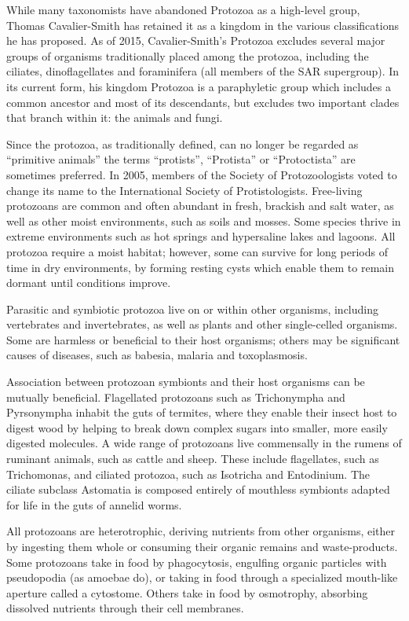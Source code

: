 While many taxonomists have abandoned Protozoa as a high-level group, Thomas Cavalier-Smith has retained it as a kingdom in the various classifications he has proposed. As of 2015, Cavalier-Smith's Protozoa excludes several major groups of organisms traditionally placed among the protozoa, including the ciliates, dinoflagellates and foraminifera (all members of the SAR supergroup). In its current form, his kingdom Protozoa is a paraphyletic group which includes a common ancestor and most of its descendants, but excludes two important clades that branch within it: the animals and fungi.

Since the protozoa, as traditionally defined, can no longer be regarded as ``primitive animals'' the terms ``protists'', ``Protista'' or ``Protoctista'' are sometimes preferred. In 2005, members of the Society of Protozoologists voted to change its name to the International Society of Protistologists.
Free-living protozoans are common and often abundant in fresh, brackish and salt water, as well as other moist environments, such as soils and mosses. Some species thrive in extreme environments such as hot springs and hypersaline lakes and lagoons. All protozoa require a moist habitat; however, some can survive for long periods of time in dry environments, by forming resting cysts which enable them to remain dormant until conditions improve.

Parasitic and symbiotic protozoa live on or within other organisms, including vertebrates and invertebrates, as well as plants and other single-celled organisms. Some are harmless or beneficial to their host organisms; others may be significant causes of diseases, such as babesia, malaria and toxoplasmosis.

Association between protozoan symbionts and their host organisms can be mutually beneficial. Flagellated protozoans such as Trichonympha and Pyrsonympha inhabit the guts of termites, where they enable their insect host to digest wood by helping to break down complex sugars into smaller, more easily digested molecules. A wide range of protozoans live commensally in the rumens of ruminant animals, such as cattle and sheep. These include flagellates, such as Trichomonas, and ciliated protozoa, such as Isotricha and Entodinium. The ciliate subclass Astomatia is composed entirely of mouthless symbionts adapted for life in the guts of annelid worms.

All protozoans are heterotrophic, deriving nutrients from other organisms, either by ingesting them whole or consuming their organic remains and waste-products. Some protozoans take in food by phagocytosis, engulfing organic particles with pseudopodia (as amoebae do), or taking in food through a specialized mouth-like aperture called a cytostome. Others take in food by osmotrophy, absorbing dissolved nutrients through their cell membranes.

